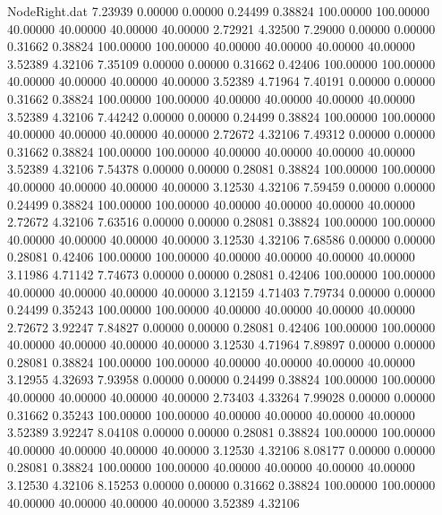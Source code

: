 \begin{filecontents}{NodeRight.dat}
   7.23939    0.00000    0.00000     0.24499    0.38824  100.00000  100.00000   40.00000   40.00000   40.00000   40.00000    2.72921    4.32500
   7.29000    0.00000    0.00000     0.31662    0.38824  100.00000  100.00000   40.00000   40.00000   40.00000   40.00000    3.52389    4.32106
   7.35109    0.00000    0.00000     0.31662    0.42406  100.00000  100.00000   40.00000   40.00000   40.00000   40.00000    3.52389    4.71964
   7.40191    0.00000    0.00000     0.31662    0.38824  100.00000  100.00000   40.00000   40.00000   40.00000   40.00000    3.52389    4.32106
   7.44242    0.00000    0.00000     0.24499    0.38824  100.00000  100.00000   40.00000   40.00000   40.00000   40.00000    2.72672    4.32106
   7.49312    0.00000    0.00000     0.31662    0.38824  100.00000  100.00000   40.00000   40.00000   40.00000   40.00000    3.52389    4.32106
   7.54378    0.00000    0.00000     0.28081    0.38824  100.00000  100.00000   40.00000   40.00000   40.00000   40.00000    3.12530    4.32106
   7.59459    0.00000    0.00000     0.24499    0.38824  100.00000  100.00000   40.00000   40.00000   40.00000   40.00000    2.72672    4.32106
   7.63516    0.00000    0.00000     0.28081    0.38824  100.00000  100.00000   40.00000   40.00000   40.00000   40.00000    3.12530    4.32106
   7.68586    0.00000    0.00000     0.28081    0.42406  100.00000  100.00000   40.00000   40.00000   40.00000   40.00000    3.11986    4.71142
   7.74673    0.00000    0.00000     0.28081    0.42406  100.00000  100.00000   40.00000   40.00000   40.00000   40.00000    3.12159    4.71403
   7.79734    0.00000    0.00000     0.24499    0.35243  100.00000  100.00000   40.00000   40.00000   40.00000   40.00000    2.72672    3.92247
   7.84827    0.00000    0.00000     0.28081    0.42406  100.00000  100.00000   40.00000   40.00000   40.00000   40.00000    3.12530    4.71964
   7.89897    0.00000    0.00000     0.28081    0.38824  100.00000  100.00000   40.00000   40.00000   40.00000   40.00000    3.12955    4.32693
   7.93958    0.00000    0.00000     0.24499    0.38824  100.00000  100.00000   40.00000   40.00000   40.00000   40.00000    2.73403    4.33264
   7.99028    0.00000    0.00000     0.31662    0.35243  100.00000  100.00000   40.00000   40.00000   40.00000   40.00000    3.52389    3.92247
   8.04108    0.00000    0.00000     0.28081    0.38824  100.00000  100.00000   40.00000   40.00000   40.00000   40.00000    3.12530    4.32106
   8.08177    0.00000    0.00000     0.28081    0.38824  100.00000  100.00000   40.00000   40.00000   40.00000   40.00000    3.12530    4.32106
   8.15253    0.00000    0.00000     0.31662    0.38824  100.00000  100.00000   40.00000   40.00000   40.00000   40.00000    3.52389    4.32106

\end{filecontents}
